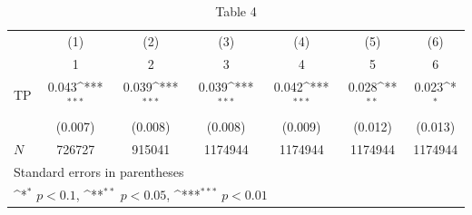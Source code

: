 \begin{table}[htbp]\centering
\def\sym#1{\ifmmode^{#1}\else\(^{#1}\)\fi}
\caption{Table 4}
\begin{tabular}{l*{6}{c}}
\hline\hline
            &\multicolumn{1}{c}{(1)}&\multicolumn{1}{c}{(2)}&\multicolumn{1}{c}{(3)}&\multicolumn{1}{c}{(4)}&\multicolumn{1}{c}{(5)}&\multicolumn{1}{c}{(6)}\\
            &\multicolumn{1}{c}{1}&\multicolumn{1}{c}{2}&\multicolumn{1}{c}{3}&\multicolumn{1}{c}{4}&\multicolumn{1}{c}{5}&\multicolumn{1}{c}{6}\\
\hline
TP          &  0.043\sym{***}&  0.039\sym{***}&  0.039\sym{***}&  0.042\sym{***}&  0.028\sym{**} &  0.023\sym{*}  \\
            &(0.007)         &(0.008)         &(0.008)         &(0.009)         &(0.012)         &(0.013)         \\
\hline
\(N\)       & 726727         & 915041         &1174944         &1174944         &1174944         &1174944         \\
\hline\hline
\multicolumn{7}{l}{\footnotesize Standard errors in parentheses}\\
\multicolumn{7}{l}{\footnotesize \sym{*} \(p<0.1\), \sym{**} \(p<0.05\), \sym{***} \(p<0.01\)}\\
\end{tabular}
\end{table}
